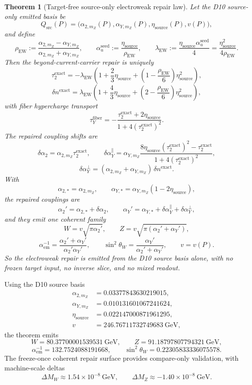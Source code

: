 \documentclass[11pt]{article}
\newtheorem{theorem}{Theorem}[section]
\begin{document}
\begin{theorem}[Target-free source-only electroweak repair law]
Let the D10 source-only emitted basis be
\[
Q_{\mathrm{src}}(P)=
\bigl(\alpha_{2,m_Z}(P),\alpha_{Y,m_Z}(P),\eta_{\mathrm{source}}(P),v(P)\bigr),
\]
and define
\[
\rho_{\mathrm{EW}}
:=
\frac{\alpha_{2,m_Z}-\alpha_{Y,m_Z}}{\alpha_{2,m_Z}+\alpha_{Y,m_Z}},
\qquad
\alpha_u^{\mathrm{seed}}
:=
\frac{\eta_{\mathrm{source}}}{\rho_{\mathrm{EW}}},
\qquad
\lambda_{\mathrm{EW}}
:=
\frac{\eta_{\mathrm{source}}\alpha_u^{\mathrm{seed}}}{4}
=
\frac{\eta_{\mathrm{source}}^2}{4\rho_{\mathrm{EW}}}.
\]
Then the beyond-current-carrier repair is uniquely
\[
\tau_2^{\mathrm{exact}}
=
-\lambda_{\mathrm{EW}}
\left(
1+\frac23\eta_{\mathrm{source}}
+
\left(1-\frac{\rho_{\mathrm{EW}}}{6}\right)\eta_{\mathrm{source}}^2
\right),
\]
\[
\delta n^{\mathrm{exact}}
=
\lambda_{\mathrm{EW}}
\left(
1+\frac43\eta_{\mathrm{source}}
+
\left(2-\frac{\rho_{\mathrm{EW}}}{6}\right)\eta_{\mathrm{source}}^2
\right),
\]
with fiber hypercharge transport
\[
\tau_Y^{\mathrm{fiber}}
=
-\frac{\tau_2^{\mathrm{exact}}+2\eta_{\mathrm{source}}}
{1+4(\tau_2^{\mathrm{exact}})^2}.
\]
The repaired coupling shifts are
\[
\delta\alpha_2=\alpha_{2,m_Z}\tau_2^{\mathrm{exact}},
\qquad
\delta\alpha_Y^{\parallel}
=
\alpha_{Y,m_Z}
\frac{8\eta_{\mathrm{source}}(\tau_2^{\mathrm{exact}})^2-\tau_2^{\mathrm{exact}}}
{1+4(\tau_2^{\mathrm{exact}})^2},
\]
\[
\delta\alpha_Y^{\perp}
=
(\alpha_{2,m_Z}+\alpha_{Y,m_Z})\,\delta n^{\mathrm{exact}}.
\]
With
\[
\alpha_{2,*}=\alpha_{2,m_Z},
\qquad
\alpha_{Y,*}=\alpha_{Y,m_Z}(1-2\eta_{\mathrm{source}}),
\]
the repaired couplings are
\[
\alpha_2'=\alpha_{2,*}+\delta\alpha_2,
\qquad
\alpha_Y'=\alpha_{Y,*}+\delta\alpha_Y^{\parallel}+\delta\alpha_Y^{\perp},
\]
and they emit one coherent family
\[
W=v\sqrt{\pi\alpha_2'},
\qquad
Z=v\sqrt{\pi(\alpha_2'+\alpha_Y')},
\]
\[
\alpha_{\mathrm{em}}^{-1}
=
\frac{\alpha_2'+\alpha_Y'}{\alpha_2'\alpha_Y'},
\qquad
\sin^2\theta_W
=
\frac{\alpha_Y'}{\alpha_2'+\alpha_Y'},
\qquad
v=v(P).
\]
So the electroweak repair is emitted from the D10 source basis alone, with no frozen target input,
no inverse slice, and no mixed readout.
\end{theorem}

Using the D10 source basis
\[
\begin{aligned}
\alpha_{2,m_Z}&=0.03377843630219015,\\
\alpha_{Y,m_Z}&=0.010131601067241624,\\
\eta_{\mathrm{source}}&=0.022147000871961295,\\
v&=246.76711732749683~\mathrm{GeV},
\end{aligned}
\]
the theorem emits
\[
W=80.37700001539531~\mathrm{GeV},
\qquad
Z=91.18797807794321~\mathrm{GeV},
\]
\[
\alpha_{\mathrm{em}}^{-1}=132.7524088191668,
\qquad
\sin^2\theta_W=0.22305833336075578.
\]
The freeze-once coherent repair surface provides compare-only validation, with machine-scale deltas
\[
\Delta M_W\approx 1.54\times 10^{-8}~\mathrm{GeV},
\qquad
\Delta M_Z\approx -1.40\times 10^{-8}~\mathrm{GeV}.
\]
\end{document}

